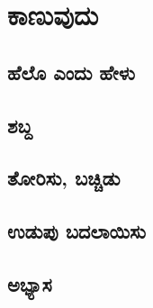\chapter{ಕಾಣುವುದು}

\section{ಹೆಲೊ ಎಂದು ಹೇಳು }

\section{ಶಬ್ದ }
\SampleProgram

\section{ತೋರಿಸು, ಬಚ್ಚಿಡು}

\section{ಉಡುಪು ಬದಲಾಯಿಸು}

\section{ಅಭ್ಯಾಸ }